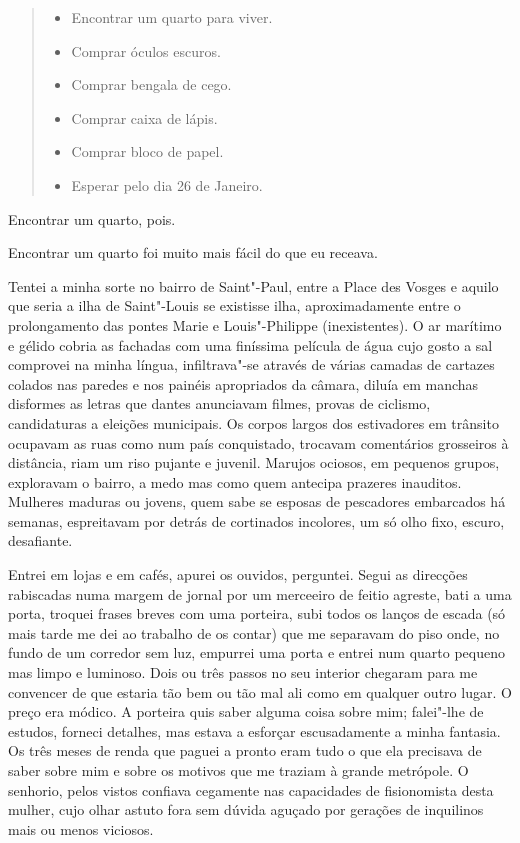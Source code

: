 \begin{quote}
\begin{itemize}
\item Encontrar um quarto para viver.

\item Comprar óculos escuros.

\item Comprar bengala de cego.

\item Comprar caixa de lápis.

\item Comprar bloco de papel.

\item Esperar pelo dia 26 de Janeiro.
\end{itemize}
\end{quote}

Encontrar um quarto, pois.

Encontrar um quarto foi muito mais fácil do que eu receava.

Tentei a minha sorte no bairro de Saint"-Paul, entre a Place des Vosges e
aquilo que seria a ilha de Saint"-Louis se existisse ilha,
aproximadamente entre o prolongamento das pontes Marie e Louis"-Philippe
(inexistentes). O ar marítimo e gélido cobria as fachadas com uma
finíssima película de água cujo gosto a sal comprovei na minha língua,
infiltrava"-se através de várias camadas de cartazes colados nas paredes
e nos painéis apropriados da câmara, diluía em manchas disformes as
letras que dantes anunciavam filmes, provas de ciclismo, candidaturas
a eleições municipais. Os corpos largos dos estivadores em trânsito
ocupavam as ruas como num país conquistado, trocavam comentários
grosseiros à distância, riam um riso pujante e juvenil. Marujos ociosos,
em pequenos grupos, exploravam o bairro, a medo mas como quem antecipa
prazeres inauditos. Mulheres maduras ou jovens, quem sabe se esposas
de pescadores embarcados há semanas, espreitavam por detrás de
cortinados incolores, um só olho fixo, escuro, desafiante.

Entrei em lojas e em cafés, apurei os ouvidos, perguntei. Segui as
direcções rabiscadas numa margem de jornal por um merceeiro de feitio
agreste, bati a uma porta, troquei frases breves com uma porteira, subi
todos os lanços de escada (só mais tarde me dei ao trabalho de os
contar) que me separavam do piso onde, no fundo de um corredor sem luz,
empurrei uma porta e entrei num quarto pequeno mas limpo e luminoso.
Dois ou três passos no seu interior chegaram para me convencer de que
estaria tão bem ou tão mal ali como em qualquer outro lugar. O preço era
módico. A porteira quis saber alguma coisa sobre mim; falei"-lhe de
estudos, forneci detalhes, mas estava a esforçar escusadamente a minha
fantasia. Os três meses de renda que paguei a pronto eram tudo o que
ela precisava de saber sobre mim e sobre os motivos que me traziam à
grande metrópole. O senhorio, pelos vistos confiava cegamente nas
capacidades de fisionomista desta mulher, cujo olhar astuto fora sem
dúvida aguçado por gerações de inquilinos mais ou menos viciosos.

